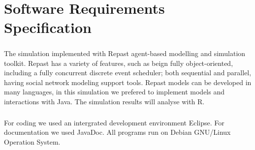 \chapter{Software Requirements Specification}
\paragraph{}
The simulation implemented with Repast agent-based modelling and simulation toolkit.
Repast has a variety of features, such as beign fully object-oriented, including a fully concurrent discrete event scheduler; both sequential and parallel, having social network modeling support tools.
Repast models can be developed in many languages, in this simulation we prefered to implement models and interactions with Java.
The simulation results will analyse with R. 
\paragraph{}
For coding we used an intergrated development environment Eclipse.
For documentation we used JavaDoc.
All programs run on Debian GNU/Linux Operation System. 